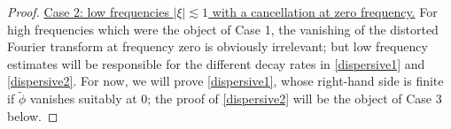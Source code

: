 \documentclass[11 pt]{amsart}
\theoremstyle{definition}
\theoremstyle{remark}
\numberwithin{equation}{section}
\newcommand{\dd}{\mathop{}\!\mathrm{d}}
\begin{document}
\begin{proof}
\medskip

%

\noindent
\underline{Case 2: low frequencies $|\xi| \lesssim 1$ with a cancellation at zero frequency.} For high frequencies which were the object of Case 1, the vanishing of the distorted Fourier transform at frequency zero is obviously irrelevant; but low frequency estimates will be responsible for the different decay rates in \eqref{dispersive1} and \eqref{dispersive2}. For now, we will prove \eqref{dispersive1}, whose right-hand side is finite if $\widetilde{\phi}$ vanishes suitably at $0$; the proof of \eqref{dispersive2} will be the object of Case 3 below.


\end{proof}
\end{document}
